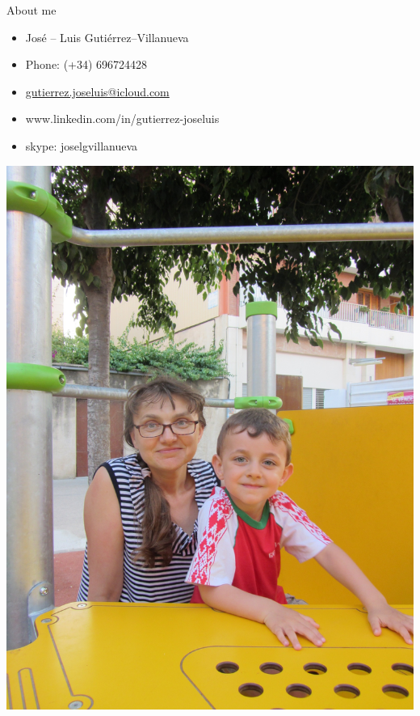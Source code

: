 \documentclass[newPxFont,numfooter,sectionpages]{beamer}
\newcommand{\1}{\'{\i}}
\begin{document}
\begin{frame}[c]{About me}

\begin{itemize}

\item Jos\'e -- Luis Guti\'errez--Villanueva
\item Phone: (+34) 696724428
\item \href{mailto:gutierrez.joseluis@icloud.com}{gutierrez.joseluis@icloud.com}
\item  www.linkedin.com/in/gutierrez-joseluis
\item skype: joselgvillanueva

\end{itemize}

\pause \centering \includegraphics[scale=0.05]{family.JPG}

\end{frame}
\end{document}
